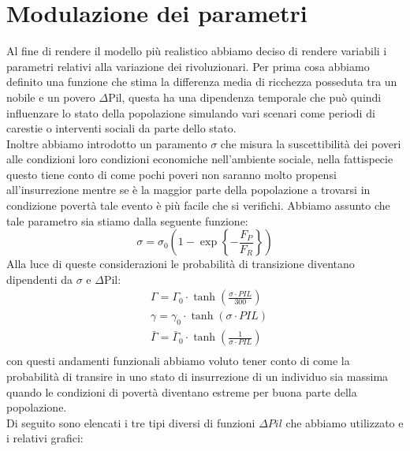 \section{Modulazione dei parametri}
Al fine di rendere il modello più realistico abbiamo deciso di rendere variabili i parametri relativi alla variazione dei rivoluzionari. Per prima cosa abbiamo definito una funzione che stima la differenza media di ricchezza posseduta tra un nobile e un povero $\Delta\text{Pil}$, questa ha una dipendenza temporale che può quindi influenzare lo stato della popolazione simulando vari scenari come periodi di carestie o interventi sociali da parte dello stato.\\
Inoltre abbiamo introdotto un paramento $\sigma$ che misura la suscettibilità dei poveri alle condizioni loro condizioni economiche nell'ambiente sociale, nella fattispecie questo tiene conto di come pochi poveri non saranno molto propensi all'insurrezione mentre se è la maggior parte della popolazione a trovarsi in condizione povertà tale evento è più facile che si verifichi. Abbiamo assunto che tale parametro sia stiamo dalla seguente funzione: 
\begin{equation}
	\sigma= \sigma_0\left(1-\exp\left\{-\frac{F_P}{F_R}\right\}\right)
\end{equation}
Alla luce di queste considerazioni le probabilità di transizione diventano dipendenti da $\sigma$ e $\Delta\text{Pil}$:
\begin{equation}
	\begin{aligned}
	&\Gamma=\Gamma_{0}\cdot\tanh\left(\frac{\sigma\cdot PIL}{300}\right)\\
	&\gamma=\gamma_{0}\cdot\tanh\left(\sigma\cdot PIL\right)\\
	&\bar{\Gamma}=\bar{\Gamma}_{0}\cdot\tanh\left(\frac{1}{\sigma\cdot PIL}\right)\\
	\end{aligned}
\end{equation}
con questi andamenti funzionali abbiamo voluto tener conto di come la probabilità di transire in uno stato di insurrezione di un individuo sia massima quando le condizioni di povertà diventano estreme per buona parte della popolazione.\\
Di seguito sono elencati i tre tipi diversi di funzioni $ \Delta Pil $ che abbiamo utilizzato e i relativi grafici:
